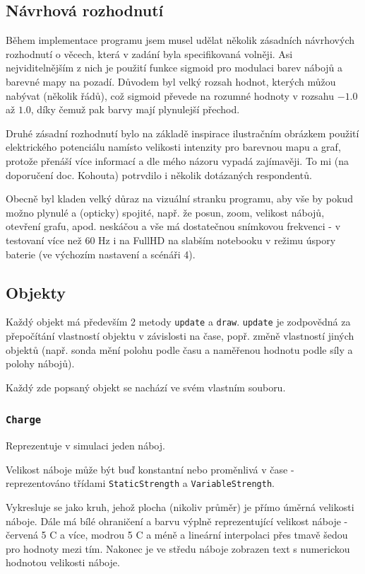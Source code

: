 \documentclass[12pt,a4paper]{article}
\newcommand{\code}[1]{\texttt{#1}}
\begin{document}
\subsection{Návrhová rozhodnutí}

Během implementace programu jsem musel udělat několik zásadních návrhových
rozhodnutí o věcech, která v zadání byla specifikovaná volněji. Asi
nejviditelnějším z nich je použití funkce sigmoid pro modulaci barev nábojů a
barevné mapy na pozadí. Důvodem byl velký rozsah hodnot, kterých můžou nabývat
(několik řádů), což sigmoid převede na rozumné hodnoty v rozsahu $-1.0$ až
$1.0$, díky čemuž pak barvy mají plynulejší přechod.

Druhé zásadní rozhodnutí bylo na základě inspirace ilustračním obrázkem použití
elektrického potenciálu namísto velikosti intenzity pro barevnou mapu a graf,
protože přenáší více informací a dle mého názoru vypadá zajímavěji. To mi (na
doporučení doc. Kohouta) potrvdilo i několik dotázaných respondentů.

Obecně byl kladen velký důraz na vizuální stranku programu, aby vše by pokud
možno plynulé a (opticky) spojité, např. že posun, zoom, velikost nábojů,
otevření grafu, apod. neskáčou a vše má dostatečnou snímkovou frekvenci - v
testovaní více než 60 Hz i na FullHD na slabším notebooku v režimu úspory
baterie (ve výchozím nastavení a scénáři 4).

\subsection{Objekty}

Každý objekt má především 2 metody \code{update} a \code{draw}. \code{update} je
zodpovědná za přepočítání vlastností objektu v závislosti na čase, popř. změně
vlastností jiných objektů (např. sonda mění polohu podle času a naměřenou
hodnotu podle síly a polohy nábojů).

Každý zde popsaný objekt se nachází ve svém vlastním souboru.

\subsubsection{\code{Charge}}

Reprezentuje v simulaci jeden náboj. 

Velikost náboje může být buď konstantní nebo proměnlivá v čase - reprezentováno
třídami \code{StaticStrength} a \code{VariableStrength}. 

Vykresluje se jako kruh, jehož plocha (nikoliv průměr) je přímo úměrná velikosti
náboje. Dále má bílé ohraničení a barvu výplně reprezentující velikost náboje -
červená 5 C a více, modrou 5 C a méně a lineární interpolaci přes tmavě šedou
pro hodnoty mezi tím. Nakonec je ve středu náboje zobrazen text s numerickou
hodnotou velikosti náboje.
\end{document}
